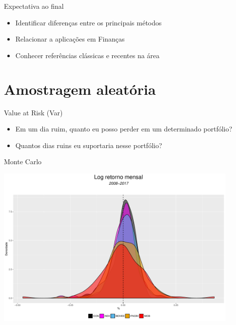 \documentclass{beamer}
\begin{document}
\begin{frame}{Expectativa ao final}

\begin{itemize}
\item Identificar diferenças entre os principais métodos
\item Relacionar a aplicações em Finanças
\item Conhecer referências clássicas e recentes na área
\end{itemize}

\end{frame}

\section{Amostragem aleatória}



\begin{frame}{Value at Risk (Var)}

\begin{itemize}
\item Em um dia ruim, quanto eu posso perder em um determinado portfólio? 
\item Quantos dias ruins eu suportaria nesse portfólio?
\end{itemize}

\end{frame}




\begin{frame}{Monte Carlo}

\begin{center}
 \includegraphics[height=8cm,keepaspectratio]{decritiva_indices.pdf}
 \end{center}

\end{frame}
\end{document}

